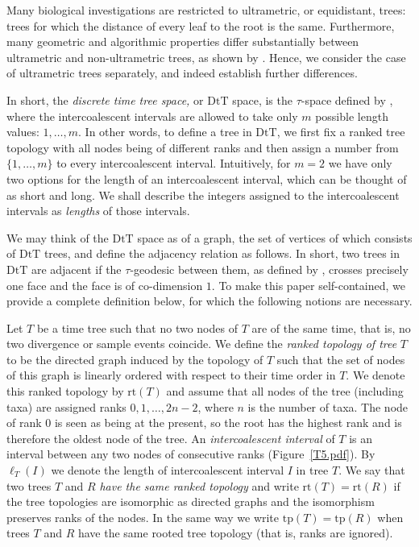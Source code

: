 \documentclass{amsart}
\newcommand{\mdts}{\mathrm{DtT}}
\newcommand{\rt}{\mathrm{rt}}
\newcommand{\tp}{\mathrm{tp}}
\begin{document}
Many biological investigations are restricted to ultrametric, or equidistant, trees: trees for which the distance of every leaf to the root is the same.
Furthermore, many geometric and algorithmic properties differ substantially between ultrametric and non-ultrametric trees, as shown by \textcite{Gavryushkin2014-bw}.
Hence, we consider the case of ultrametric trees separately, and indeed establish further differences.

In short, the {\em discrete time tree space,} or $\mdts$ space, is the $\tau$-space defined by \textcite{Gavryushkin2014-bw}, where the intercoalescent intervals are allowed to take only $m$ possible length values: $1,\ldots,m$.
In other words, to define a tree in $\mdts$, we first fix a ranked tree topology with all nodes being of different ranks and then assign a number from $\{1, \ldots, m\}$ to every intercoalescent interval.
Intuitively, for $m = 2$ we have only two options for the length of an intercoalescent interval, which can be thought of as short and long.
We shall describe the integers assigned to the intercoalescent intervals as {\em lengths} of those intervals.

We may think of the $\mdts$ space as of a graph, the set of vertices of which consists of $\mdts$ trees, and define the adjacency relation as follows.
In short, two trees in $\mdts$ are adjacent if the $\tau$-geodesic between them, as defined by \textcite{Gavryushkin2014-bw}, crosses precisely one face and the face is of co-dimension $1$.
To make this paper self-contained, we provide a complete definition below, for which the following notions are necessary.

Let $T$ be a time tree such that no two nodes of $T$ are of the same time, that is, no two divergence or sample events coincide.
We define the {\em ranked topology of tree} $T$ to be the directed graph induced by the topology of $T$ such that the set of nodes of this graph is linearly ordered with respect to their time order in $T$.
We denote this ranked topology by $\rt(T)$ and assume that all nodes of the tree (including taxa) are assigned ranks $0,1,\ldots,2n-2$, where $n$ is the number of taxa.
The node of rank $0$ is seen as being at the present, so the root has the highest rank and is therefore the oldest node of the tree.
An {\em intercoalescent interval} of $T$ is an interval between any two nodes of consecutive ranks (Figure~\ref{T5.pdf}).
By $\ell_T(I)$ we denote the length of intercoalescent interval $I$ in tree $T$.
We say that two trees $T$ and $R$ {\em have the same ranked topology} and write $\rt(T) = \rt(R)$ if the tree topologies are isomorphic as directed graphs and the isomorphism preserves ranks of the nodes.
In the same way we write $\tp(T) = \tp(R)$ when trees $T$ and $R$ have the same rooted tree topology (that is, ranks are ignored).
\end{document}

